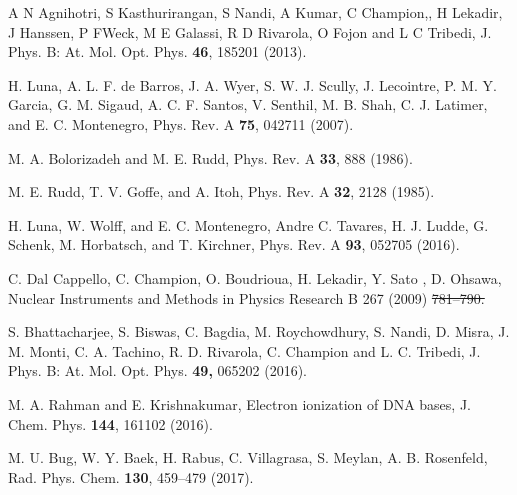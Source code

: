 \documentclass[10pt,showpacs,showkeys,twocolumn]{revtex4}
\providecommand{\DIFadd}[1]{{\protect\color{blue}\uwave{#1}}} %
\providecommand{\DIFdel}[1]{{\protect\color{red}\sout{#1}}}                      %
\providecommand{\DIFaddbegin}{} %
\providecommand{\DIFaddend}{} %
\providecommand{\DIFdelbegin}{} %
\providecommand{\DIFdelend}{} %
\begin{document}
\begin{thebibliography}{}
A N Agnihotri, S Kasthurirangan, S Nandi, A Kumar, C Champion,, H Lekadir, J Hanssen, P FWeck, M E Galassi, R D Rivarola, O Fojon and L C Tribedi, 
J. Phys. B: At. Mol. Opt. Phys.  \textbf{46}, 185201 (2013).

H. Luna, A. L. F. de Barros, J. A. Wyer, S. W. J. Scully, J. Lecointre, P. M. Y. Garcia, G. M. Sigaud, A. C. F. Santos,
V. Senthil, M. B. Shah, C. J. Latimer, and E. C. Montenegro,
Phys. Rev. A \textbf{75}, 042711 (2007).


 M. A. Bolorizadeh and M. E. Rudd, Phys. Rev. A \textbf{33}, 888 (1986). 




 M. E. Rudd, T. V. Goffe, and A. Itoh,  Phys. Rev. A \textbf{32}, 2128 (1985).


 H. Luna, W. Wolff, and E. C. Montenegro, Andre C. Tavares, H. J. Ludde, G. Schenk, M. Horbatsch, and T. Kirchner, Phys. Rev. A \textbf{93}, 052705 (2016).  

C. Dal Cappello, C. Champion, O. Boudrioua, H. Lekadir, Y. Sato , D. Ohsawa, 
Nuclear Instruments and Methods in Physics Research B 267 (2009) \DIFdelbegin \DIFdel{781–790.
}\DIFdelend \DIFaddbegin \DIFadd{781--790.
}\DIFaddend 

 S. Bhattacharjee, S. Biswas, C. Bagdia, M. Roychowdhury, S. Nandi, D. Misra, J. M. Monti, C. A. Tachino, R. D. Rivarola, C. Champion and L. C. Tribedi, J. Phys. B: At. Mol. Opt. Phys. \textbf{49,}  065202 (2016).



M. A. Rahman and E. Krishnakumar,
Electron ionization of DNA bases,
J. Chem. Phys. \textbf{144}, 161102 (2016).


M. U. Bug, W. Y. Baek, H. Rabus, C. Villagrasa, S. Meylan, A. B. Rosenfeld,
Rad. Phys. Chem. \textbf{130}, 459--479 (2017).



\end{thebibliography}
\end{document}
